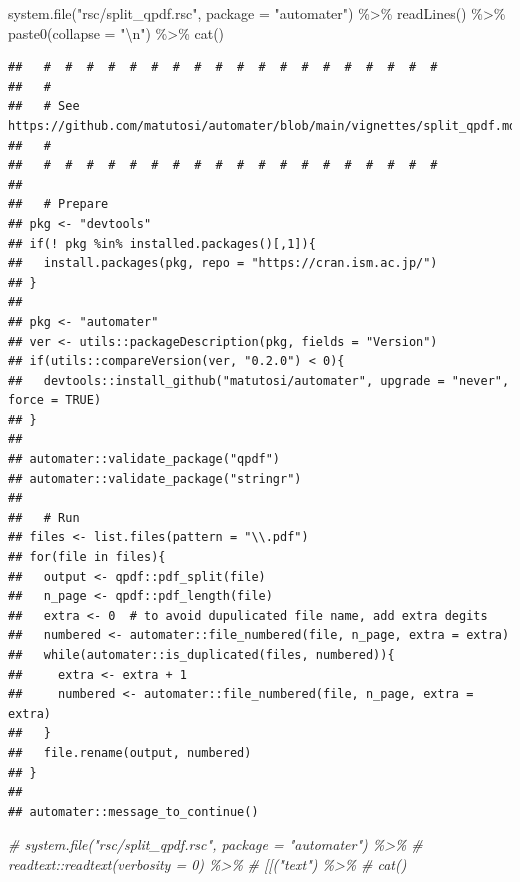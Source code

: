 \documentclass[
]{article}
\newenvironment{Shaded}{\begin{snugshade}}{\end{snugshade}}
\newcommand{\AttributeTok}[1]{\textcolor[rgb]{0.77,0.63,0.00}{#1}}
\newcommand{\CommentTok}[1]{\textcolor[rgb]{0.56,0.35,0.01}{\textit{#1}}}
\newcommand{\FunctionTok}[1]{\textcolor[rgb]{0.00,0.00,0.00}{#1}}
\newcommand{\NormalTok}[1]{#1}
\newcommand{\SpecialCharTok}[1]{\textcolor[rgb]{0.00,0.00,0.00}{#1}}
\newcommand{\StringTok}[1]{\textcolor[rgb]{0.31,0.60,0.02}{#1}}
\begin{document}
\begin{Shaded}
\begin{Highlighting}[]
\FunctionTok{system.file}\NormalTok{(}\StringTok{"rsc/split\_qpdf.rsc"}\NormalTok{, }\AttributeTok{package =} \StringTok{"automater"}\NormalTok{) }\SpecialCharTok{\%\textgreater{}\%}
  \FunctionTok{readLines}\NormalTok{() }\SpecialCharTok{\%\textgreater{}\%}
  \FunctionTok{paste0}\NormalTok{(}\AttributeTok{collapse =} \StringTok{"}\SpecialCharTok{\textbackslash{}n}\StringTok{"}\NormalTok{) }\SpecialCharTok{\%\textgreater{}\%}
  \FunctionTok{cat}\NormalTok{()}
\end{Highlighting}
\end{Shaded}

\begin{verbatim}
##   #  #  #  #  #  #  #  #  #  #  #  #  #  #  #  #  #  #  # 
##   # 
##   # See https://github.com/matutosi/automater/blob/main/vignettes/split_qpdf.md
##   # 
##   #  #  #  #  #  #  #  #  #  #  #  #  #  #  #  #  #  #  # 
## 
##   # Prepare
## pkg <- "devtools"
## if(! pkg %in% installed.packages()[,1]){
##   install.packages(pkg, repo = "https://cran.ism.ac.jp/")
## }
## 
## pkg <- "automater"
## ver <- utils::packageDescription(pkg, fields = "Version")
## if(utils::compareVersion(ver, "0.2.0") < 0){
##   devtools::install_github("matutosi/automater", upgrade = "never", force = TRUE)
## }
## 
## automater::validate_package("qpdf")
## automater::validate_package("stringr")
## 
##   # Run
## files <- list.files(pattern = "\\.pdf")
## for(file in files){
##   output <- qpdf::pdf_split(file)
##   n_page <- qpdf::pdf_length(file)
##   extra <- 0  # to avoid dupulicated file name, add extra degits
##   numbered <- automater::file_numbered(file, n_page, extra = extra)
##   while(automater::is_duplicated(files, numbered)){
##     extra <- extra + 1
##     numbered <- automater::file_numbered(file, n_page, extra = extra)
##   }
##   file.rename(output, numbered)
## }
## 
## automater::message_to_continue()
\end{verbatim}

\begin{Shaded}
\begin{Highlighting}[]
  \CommentTok{\# system.file("rsc/split\_qpdf.rsc", package = "automater") \%\textgreater{}\%}
  \CommentTok{\#   readtext::readtext(verbosity = 0) \%\textgreater{}\%}
  \CommentTok{\#   \textasciigrave{}[[\textasciigrave{}("text") \%\textgreater{}\%}
  \CommentTok{\#   cat()}
\end{Highlighting}
\end{Shaded}
\end{document}
